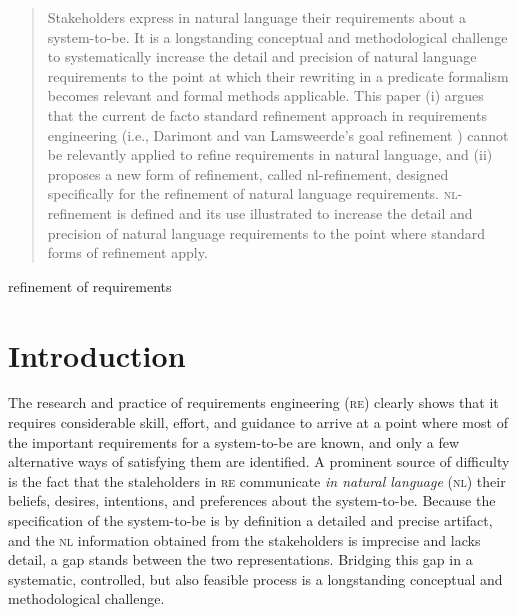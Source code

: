 \documentclass[10pt, conference, compsocconf]{IEEEtran}
\begin{document}
\begin{abstract}
	Stakeholders express in natural language their requirements about a system-to-be. It is a longstanding conceptual and methodological challenge to systematically increase the detail and precision of natural language requirements to the point at which their rewriting in a predicate formalism becomes relevant and formal methods applicable. This paper (i) argues that the current de facto standard refinement approach in requirements engineering (i.e., Darimont and van Lamsweerde's goal refinement \cite{Darimont+:1996:FSE}) cannot be relevantly applied to refine requirements in natural language, and (ii) proposes a new form of refinement, called nl-refinement, designed specifically for the refinement of natural language requirements. \textsc{nl}-refinement is defined and its use illustrated to increase the detail and precision of natural language requirements to the point where standard forms of refinement apply. 
\end{abstract}

\begin{IEEEkeywords}
refinement of requirements

\end{IEEEkeywords}


\section{Introduction}\label{sect:introduction}
The research and practice of requirements engineering (\textsc{re}) clearly shows that it requires considerable skill, effort, and guidance to arrive at a point where most of the important requirements for a system-to-be are known, and only a few alternative ways of satisfying them are identified. A prominent source of difficulty is the fact that the staleholders in \textsc{re} communicate \textit{in natural language} (\textsc{nl}) their beliefs, desires, intentions, and preferences about the system-to-be. Because the specification of the system-to-be is by definition a detailed and precise artifact, and the \textsc{nl} information obtained from the stakeholders is imprecise and lacks detail, a gap stands between the two representations. Bridging this gap in a systematic, controlled, but also feasible process is a longstanding conceptual and methodological challenge. 
\end{document}
